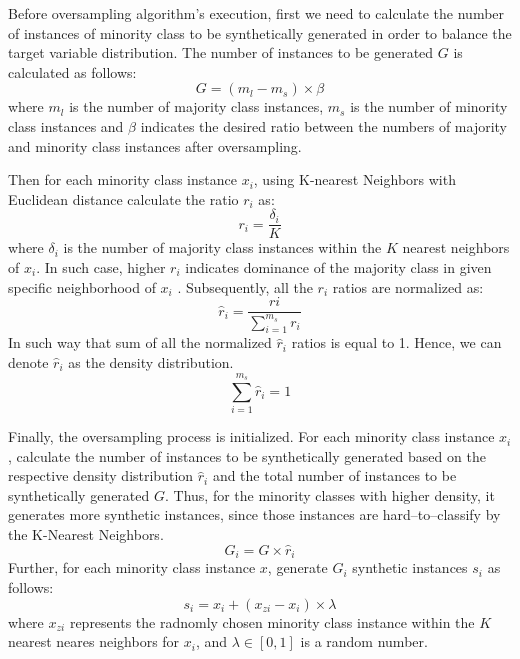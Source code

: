 Before oversampling algorithm's execution, first we need to calculate the number of instances of minority class to be synthetically generated in order to balance the target variable distribution. The number of instances to be generated $G$ is calculated as follows:
\begin{equation}\label{eq}
    G = \left(m_{l} - m_{s}\right) \times \beta
\end{equation}
where $m_l$ is the number of majority class instances, $m_s$ is the number of minority class instances and $\beta$ indicates the desired ratio between the numbers of majority and minority class instances after oversampling.

Then for each minority class instance $x_i$, using K-nearest Neighbors with Euclidean distance calculate the ratio $r_i$ as:
\begin{equation}\label{eq}
   r_{i} = \frac{\delta_{i}} {K}
\end{equation}
where $\delta_{i}$ is the number of majority class instances within the $K$ nearest neighbors of $x_i$.
In such case, higher $r_i$ indicates dominance of the majority class in given specific neighborhood of $x_i$ \citep{nian2018introduction}.
Subsequently, all the $r_i$ ratios are normalized as:
\begin{equation}\label{eq}
    \hat{r}_{i} = \frac{r{i}}{\displaystyle\sum_{i=1}^{m_{s}} r_{i}}
\end{equation}
In such way that sum of all the normalized $\hat{r}_i$ ratios is equal to 1. Hence, we can denote $\hat{r}_i$ as the density distribution.
\begin{equation}\label{eq}
    \sum_{i=1}^{m_{s}} \hat{r}_{i} = 1
\end{equation}

Finally, the oversampling process is initialized.
For each minority class instance $x_i$, calculate the number of instances to be synthetically generated based on the respective density distribution $\hat{r}_i$ and the total number of instances to be synthetically generated $G$. Thus, for the minority classes with higher density, it generates more synthetic instances, since those instances are hard--to--classify by the K-Nearest Neighbors.
\begin{equation}\label{eq}
    G_i = G \times \hat{r}_{i}
\end{equation}
Further, for each minority class instance $x$, generate $G_i$ synthetic instances $s_i$ as follows:
\begin{equation}\label{eq}
    s_i = x_i + \left(x_{zi} - x_{i} \right) \times \lambda
\end{equation}
where $x_{zi}$ represents the radnomly chosen minority class instance within the $K$ nearest neares neighbors for $x_i$, and $\lambda \in \left[0,1\right]$ is a random number.



